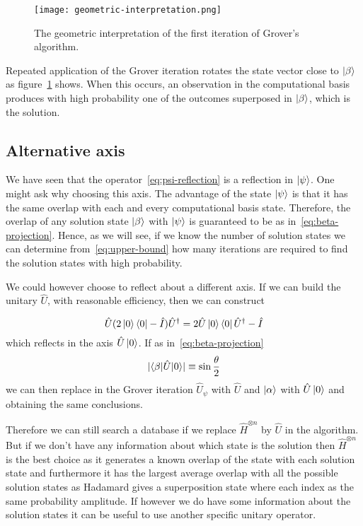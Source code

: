 \begin{figure}
\texttt{[image: geometric-interpretation.png]}
\centering
\caption{The geometric interpretation of the first iteration of Grover's algorithm.}
\label{fig:geometric-interpretation}
\end{figure}

Repeated application of the Grover iteration rotates the state vector close to $\ket{\beta}$ as figure~\ref{fig:geometric-interpretation} shows. When this occurs, an observation in the computational basis produces with high probability one of the outcomes superposed in $\ket{\beta}$, which is the solution.

\subsection{Alternative axis}
We have seen that the operator~\ref{eq:psi-reflection} is a reflection in $\ket{\psi}$. One might ask why choosing this axis. The advantage of the state $\ket{\psi}$ is that it has the same overlap with each and every computational basis state. Therefore, the overlap of any solution state $\ket{\beta}$ with $\ket{\psi}$ is guaranteed to be as in~\ref{eq:beta-projection}. Hence, as we will see, if we know the number of solution states we can determine from~\ref{eq:upper-bound} how many iterations are required to find the solution states with high probability.

We could however choose to reflect about a different axis. If we can build the unitary $\hat{U}$, with reasonable efficiency, then we can construct

\begin{equation*}
    \hat{U}(2\ket{0}\bra{0}-\hat{I})\hat{U}^\dag = 2\hat{U}\ket{0}\bra{0}\hat{U}^\dag -\hat{I}
\end{equation*}
which reflects in the axis $\hat{U}\ket{0}$.
If as in~\ref{eq:beta-projection}
\begin{equation*}
    \lvert\braket{\beta | \hat{U} |0}\rvert \equiv \sin\frac{\theta}{2}
\end{equation*}
we can then replace in the Grover iteration  $\hat{U}_\psi$ with $\hat{U}$ and $\ket{\alpha}$ with $\hat{U}\ket{0}$ and obtaining the same conclusions.

Therefore we can still search a database if we replace $\hat{H}^{\otimes n}$ by $\hat{U}$ in the algorithm. But if we don't have any information about which state is the solution then $\hat{H}^{\otimes n}$ is the best choice as it generates a known overlap of the state with each solution state and furthermore it has the largest average overlap with all the possible solution states as Hadamard gives a superposition state where each index as the same probability amplitude. If however we do have some information about the solution states it can be useful to use another specific unitary operator.